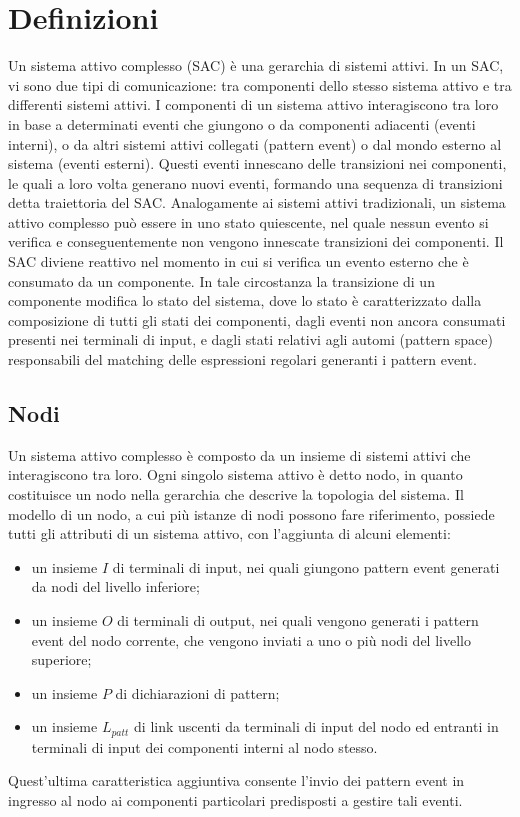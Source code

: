 \section{Definizioni}
Un sistema attivo complesso (SAC) è una gerarchia di sistemi attivi. In un SAC, vi sono due tipi di comunicazione: tra componenti dello stesso sistema attivo e tra differenti sistemi attivi. 
I componenti di un sistema attivo interagiscono tra loro in base a determinati eventi che giungono o da componenti adiacenti (eventi interni), o da altri sistemi attivi collegati (pattern event) o dal mondo esterno al sistema (eventi esterni). Questi eventi innescano delle transizioni nei componenti, le quali a loro volta generano nuovi eventi, formando una sequenza di transizioni detta traiettoria del SAC.
Analogamente ai sistemi attivi tradizionali, un sistema attivo complesso può essere in uno stato quiescente, nel quale nessun evento si verifica e conseguentemente non vengono innescate transizioni dei componenti.
Il SAC diviene reattivo nel momento in cui si verifica un evento esterno che è consumato da un componente. In tale circostanza la transizione di un componente modifica lo stato del sistema, dove lo stato è caratterizzato dalla composizione di tutti gli stati dei componenti, dagli eventi non ancora consumati presenti nei terminali di input, e dagli stati relativi agli automi (pattern space) responsabili del matching delle espressioni regolari generanti i pattern event. 

\subsection{Nodi}
Un sistema attivo complesso è composto da un insieme di sistemi attivi che interagiscono tra loro. Ogni singolo sistema attivo è detto nodo, in quanto costituisce un nodo nella gerarchia che descrive la topologia del sistema.
Il modello di un nodo, a cui più istanze di nodi possono fare riferimento, possiede tutti gli attributi di un sistema attivo, con l'aggiunta di alcuni elementi:
\begin{itemize}
\item un insieme $I$ di terminali di input, nei quali giungono pattern event generati da nodi del livello inferiore;
\item un insieme $O$ di terminali di output, nei quali vengono generati i pattern event del nodo corrente, che vengono inviati a uno o più nodi del livello superiore;
\item un insieme $P$ di dichiarazioni di pattern;
\item un insieme $L_{patt}$ di link uscenti da terminali di input del nodo ed entranti in terminali di input dei componenti interni al nodo stesso.
\end{itemize}
Quest'ultima caratteristica aggiuntiva consente l'invio dei pattern event in ingresso al nodo ai componenti particolari predisposti a gestire tali eventi.

